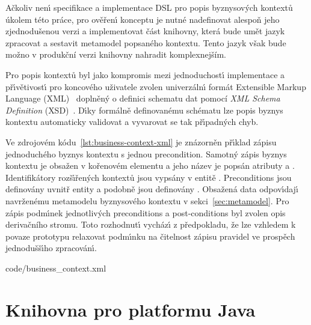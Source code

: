 Ačkoliv nen\'{\i} specifikace a implementace \gls{DSL} pro popis byznysových kontextů
úkolem této práce, pro ověřen\'{\i} konceptu je nutné nadefinovat alespoň jeho zjednodušenou
verzi a implementovat část knihovny, která bude umět jazyk zpracovat a sestavit metamodel popsaného
kontextu. Tento jazyk však bude možno v produkční verzi knihovny nahradit komplexnejším.

Pro popis kontextů byl jako kompromis mezi jednoduchost\'{\i} implementace
a př\'{\i}větivost\'{\i} pro koncového uživatele zvolen univerzáln\'{\i} formát Extensible
Markup Language (\gls{XML})~\cite{bray1997extensible} doplněný o definici schematu dat
pomocí \textit{XML Schema Definition} (\gls{XSD})~\cite{lee2000comparative}.
D\'{\i}ky formálně definovanému schématu lze popis byznys kontextu
automaticky validovat a vyvarovat se tak př\'{\i}padn\'ych chyb.

Ve zdrojovém kódu~\ref{lst:business-context-xml} je znázorněn
př\'{\i}klad zápisu jednoduchého byznys kontextu s jednou precondition.
Samotn\'y zápis byznys kontextu je obsažen v kořenovém elementu
 a jeho název je popsán atributy
 a . Identifikátory rozš\'{\i}řených kontextů jsou
vypsány v entitě . Preconditions jsou
definovány uvnitř entity  a podobně
jsou definovány . Obsažená data odpov\'{\i}daj\'{\i}
navrženému metamodelu byznysového kontextu v sekci~\ref{sec:metamodel}.
Pro zápis podm\'{\i}nek jednotliv\'ych preconditions a post-conditions byl zvolen
opis derivačního stromu. Toto rozhodnut\'{\i} vycház\'{\i} z předpokladu,
že lze vzhledem k povaze prototypu relaxovat podm\'{\i}nku
na čitelnost zápisu pravidel ve prospěch jednodušš\'{\i}ho zpracován\'{\i}.


{code/business_context.xml}

\section{Knihovna pro platformu Java}


